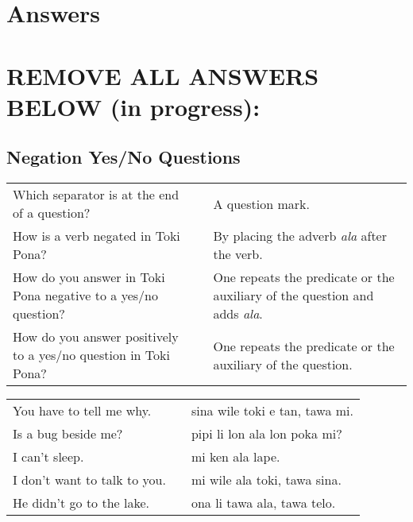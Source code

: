 
\section{Answers}
\printsolutions

\section*{REMOVE ALL ANSWERS BELOW (in progress):}

\subsection*{Negation Yes/No Questions}
\label{'negation_yes_no_questions'}

\begin{supertabular}{p{5,5cm}|ll}
    Which separator is at the end of a question?                    &  & A question mark.                                                                  \\
    How is a verb negated in Toki Pona?                             &  & By placing the adverb \textit{ala} after the verb.                                \\
    How do you answer in Toki Pona negative to a yes/no question?   &  & One repeats the predicate or the auxiliary of the question and adds \textit{ala}. \\
    How do you answer positively to a yes/no question in Toki Pona? &  & One repeats the predicate or the auxiliary of the question.                       \\
\end{supertabular}

\begin{supertabular}{p{5,5cm}|ll}
    You have to tell me why.     &  & sina wile toki e tan, tawa mi. \\
    Is a bug beside me?          &  & pipi li lon ala lon poka mi?   \\
    I can't sleep.               &  & mi ken ala lape.               \\
    I don't want to talk to you. &  & mi wile ala toki, tawa sina.   \\
    He didn't go to the lake.    &  & ona li tawa ala, tawa telo.    \\
\end{supertabular}

